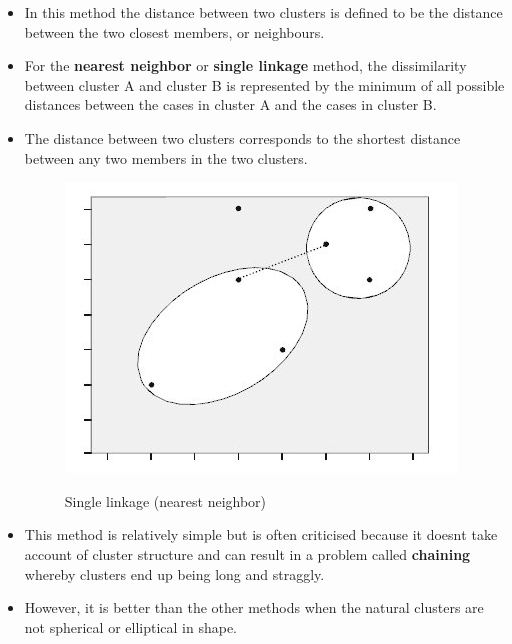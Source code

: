 \documentclass[a4paper,12pt]{article}
\begin{document}
\begin{itemize}
	\item In this method the distance between two clusters is defined to be the distance between
	the two closest members, or neighbours. 
	\item For the \textbf{nearest neighbor} or \textbf{single linkage} method, the dissimilarity between cluster A and cluster B is represented by the minimum of all possible distances between the cases in cluster A and the cases in cluster B.
		
	\item The distance between two clusters corresponds
	to the shortest distance between any two members in the two clusters.
	\begin{figure}[h!]
		\begin{center}
			\includegraphics[scale=0.4]{images/Link1.jpg}\\
			\caption{Single linkage (nearest neighbor)}
		\end{center}
	\end{figure}	
	\item This method is relatively simple but is often
	criticised because it doesnt take account of cluster structure and can result in a problem
	called \textbf{chaining} whereby clusters end up being long and straggly. 
	\item However, it is better
	than the other methods when the natural clusters are not spherical or elliptical in shape.
\end{itemize}
\end{document}
